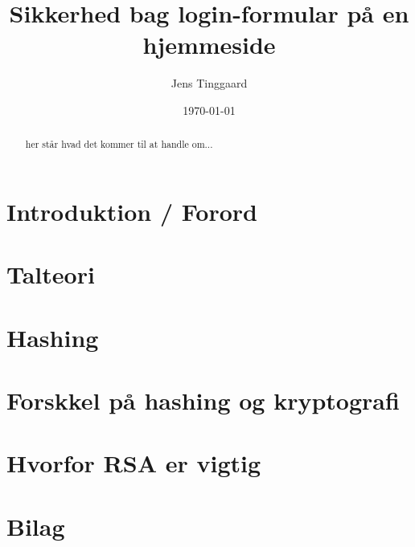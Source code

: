 \documentclass[a4paper, 12pt]{article}
\date{\today}
\title{Sikkerhed bag login-formular på en hjemmeside}
\author{Jens Tinggaard}
\theoremstyle{break}
\theoremstyle{breakline}
\begin{document}
\clearpage\maketitle
\thispagestyle{empty}
\maketitle

\begin{abstract} %
her står hvad det kommer til at handle om...
\end{abstract}



\newpage
\tableofcontents


\newpage
\section*{Introduktion / Forord}



\newpage
\section{Talteori}



\newpage
\section{Hashing}



\newpage
\section{Forskkel på hashing og kryptografi}



\newpage
\section{Hvorfor RSA er vigtig}





\newpage
\setlength\bibitemsep{10pt}
\printbibliography[
heading=bibintoc, %
title={Litteratur} %
]

\newpage
\section{Bilag}

\end{document}
